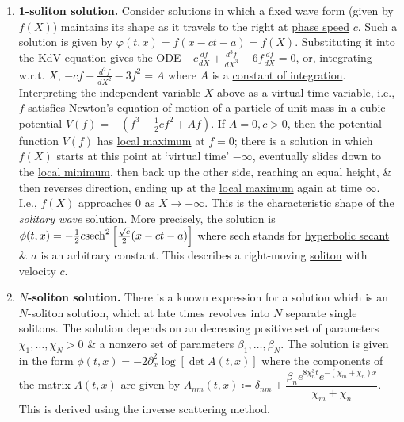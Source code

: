 \documentclass{article}
\begin{document}
\begin{enumerate}
	\item {\bf1-soliton solution.} Consider solutions in which a fixed wave form (given by $f(X)$) maintains its shape as it travels to the right at \href{https://en.wikipedia.org/wiki/Phase_speed}{phase speed} $c$. Such a solution is given by $\varphi(t,x) = f(x - ct - a) = f(X)$. Substituting it into the KdV equation gives the ODE $-c\frac{df}{dX} + \frac{d^3f}{dX^3} - 6f\frac{df}{dX} = 0$, or, integrating w.r.t. $X$, $-cf + \frac{d^2f}{dX^2} - 3f^2 = A$ where $A$ is a \href{https://en.wikipedia.org/wiki/Constant_of_integration}{constant of integration}. Interpreting the independent variable $X$ above as a virtual time variable, i.e., $f$ satisfies Newton's \href{https://en.wikipedia.org/wiki/Equation_of_motion}{equation of motion} of a particle of unit mass in a cubic potential $V(f) = -(f^3 + \frac{1}{2}cf^2 + Af)$. If $A = 0,c > 0$, then the potential function $V(f)$ has \href{https://en.wikipedia.org/wiki/Local_maximum}{local maximum} at $f = 0$; there is a solution in which $f(X)$ starts at this point at `virtual time' $-\infty$, eventually slides down to the \href{https://en.wikipedia.org/wiki/Local_minimum}{local minimum}, then back up the other side, reaching an equal height, \& then reverses direction, ending up at the \href{https://en.wikipedia.org/wiki/Local_maximum}{local maximum} again at time $\infty$. I.e., $f(X)$ approaches 0 as $X\to-\infty$. This is the characteristic shape of the \href{https://en.wikipedia.org/wiki/Soliton}{\it solitary wave} solution. More precisely, the solution is $\phi(t,x) = -\frac{1}{2}c{\rm sech}^2\left[\frac{\sqrt{c}}{2}(x - ct - a)\right]$ where sech stands for \href{https://en.wikipedia.org/wiki/Hyperbolic_secant}{hyperbolic secant} \& $a$ is an arbitrary constant. This describes a right-moving \href{https://en.wikipedia.org/wiki/Soliton}{soliton} with velocity $c$.
	\item {\bf$N$-soliton solution.} There is a known expression for a solution which is an $N$-soliton solution, which at late times revolves into $N$ separate single solitons. The solution depends on an decreasing positive set of parameters $\chi_1,\ldots,\chi_N > 0$ \& a nonzero set of parameters $\beta_1,\ldots,\beta_N$. The solution is given in the form $\phi(t,x) = -2\partial_x^2\log[\det A(t,x)]$ where the components of the matrix $A(t,x)$ are given by $A_{nm}(t,x)\coloneqq\delta_{nm} + \dfrac{\beta_ne^{8\chi_n^3t}e^{-(\chi_m + \chi_n)x}}{\chi_m + \chi_n}$. This is derived using the inverse scattering method.
\end{enumerate}
\end{document}
